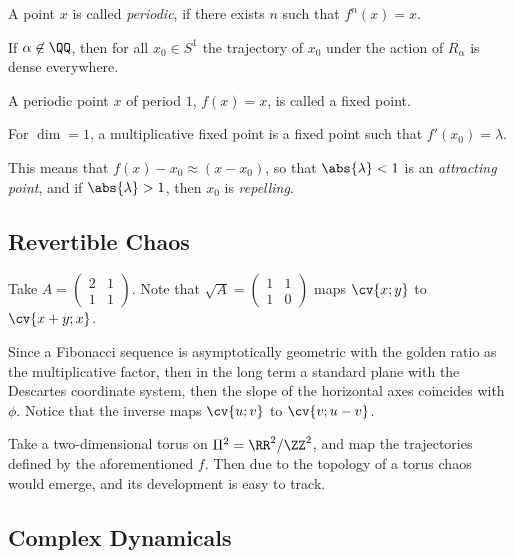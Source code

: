 \documentclass[11pt]{scrartcl}
\begin{document}
\begin{definition}
  A point $x$ is called \textit{periodic}, if there exists $n$ such
  that $f^{n}(x) = x$.
\end{definition}

\begin{theorem}
  If $\alpha \not \in \QQ$, then for all $x_{0} \in S^{1}$ the
  trajectory of $x_{0}$ under the action of $R_{\alpha}$ is dense
  everywhere.
\end{theorem}

\begin{definition}
  A periodic point $x$ of period $1$, $f(x) = x$, is called a fixed
  point.
\end{definition}

\begin{definition}
  For $\dim = 1$, a multiplicative fixed point is a fixed point such that $f'(x_{0}) = \lambda$.
\end{definition}

This means that $f(x) - x_{0} \approx (x-x_{0})$, so that
$\abs{\lambda} < 1$ is an \textit{attracting point}, and if
$\abs{\lambda} > 1$, then $x_{0}$ is \textit{repelling}.

\subsection{Revertible Chaos}

Take $A = \begin{pmatrix}
  2 & 1\\
  1 & 1
\end{pmatrix}$. Note that $\sqrt{A} = \begin{pmatrix}
  1 & 1\\
  1 & 0
\end{pmatrix}$ maps $\cv{x;y}$ to $\cv{x+ y;x}$.

Since a Fibonacci sequence is asymptotically geometric with the golden
ratio as the multiplicative factor, then in the long term a standard
plane with the Descartes coordinate system, then the slope of the
horizontal axes coincides with $\phi$. Notice that the inverse maps
$\cv{u;v}$ to $\cv{v;u-v}$.

Take a two-dimensional torus on $\Pi^{2} = \RR^{2} / \ZZ^{2}$, and map
the trajectories defined by the aforementioned $f$. Then due to the
topology of a torus chaos would emerge, and its development is easy to
track.

\subsection{Complex Dynamicals}
\end{document}
